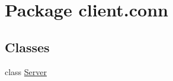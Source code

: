 \hypertarget{namespaceclient_1_1conn}{}\section{Package client.\+conn}
\label{namespaceclient_1_1conn}
\subsection*{Classes}
\begin{DoxyCompactItemize}
\item 
class \hyperlink{classclient_1_1conn_1_1_server}{Server}
\end{DoxyCompactItemize}
